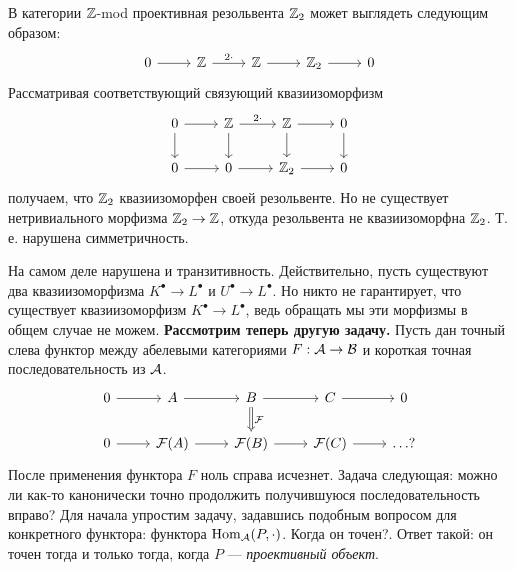 \documentclass[../main.tex]{subfiles}
\begin{document}
\begin{to_ex}
В категории $\mathbb{Z}$-mod проективная резольвента $\mathbb{Z}_2$ может выглядеть следующим образом:
\begin{equation*}
    \begin{tikzcd}
	0 & \Z & \Z & {\Z_2} & 0
	\arrow[from=1-1, to=1-2]
	\arrow["2\cdot", from=1-2, to=1-3]
	\arrow[from=1-3, to=1-4]
	\arrow[from=1-4, to=1-5]
\end{tikzcd}
\end{equation*}
Рассматривая соответствующий связующий квазиизоморфизм
\begin{equation*}
    \begin{tikzcd}
	0 & \Z & \Z & 0 \\
	0 & 0 & {\Z_2} & 0
	\arrow[from=1-1, to=1-2]
	\arrow["2\cdot", from=1-2, to=1-3]
	\arrow[from=1-3, to=1-4]
	\arrow[from=1-3, to=2-3]
	\arrow[from=1-4, to=2-4]
	\arrow[from=1-2, to=2-2]
	\arrow[from=1-1, to=2-1]
	\arrow[from=2-1, to=2-2]
	\arrow[from=2-2, to=2-3]
	\arrow[from=2-3, to=2-4]
\end{tikzcd}
\end{equation*}
получаем, что $\mathbb{Z}_2$ квазиизоморфен своей резольвенте. Но не существует нетривиального морфизма $\mathbb{Z}_2\to \mathbb{Z}$, откуда резольвента не квазиизоморфна $\mathbb{Z}_2$. Т. е. нарушена симметричность.
\end{to_ex}
На самом деле нарушена и транзитивность. Действительно, пусть существуют два квазиизоморфизма $K^\bullet \to L^\bullet$ и $U^\bullet \to L^\bullet$. Но никто не гарантирует, что существует квазиизоморфизм $K^\bullet\to L^\bullet$, ведь обращать мы эти морфизмы в общем случае не можем.
\textbf{Рассмотрим теперь другую задачу.} Пусть дан точный слева функтор между абелевыми категориями $F:\mathcal{A} \to \mathcal{B}$ и короткая точная последовательность из $\mathcal{A}$.
\begin{equation*}
\begin{tikzcd}
	0 & A & B & C & 0 \\
	0 & {\F(A)} & {\F(B)} & {\F(C)} & {\ldots ?}
	\arrow[from=1-1, to=1-2]
	\arrow[from=1-2, to=1-3]
	\arrow[from=1-3, to=1-4]
	\arrow[from=1-4, to=1-5]
	\arrow[from=2-1, to=2-2]
	\arrow[from=2-2, to=2-3]
	\arrow[from=2-3, to=2-4]
	\arrow[from=2-4, to=2-5]
	\arrow["\F", Rightarrow, from=1-3, to=2-3]
\end{tikzcd}
\end{equation*}
После применения функтора $F$ ноль справа исчезнет. Задача следующая: можно ли как-то канонически точно продолжить получившуюся последовательность вправо?
Для начала упростим задачу, задавшись подобным вопросом для конкретного функтора: функтора $\operatorname{Hom}_{\mathcal{A}}(P, \cdot)$. Когда он точен?. Ответ такой: он точен тогда и только тогда, когда $P$ --- \emph{проективный объект}.
\end{document}
